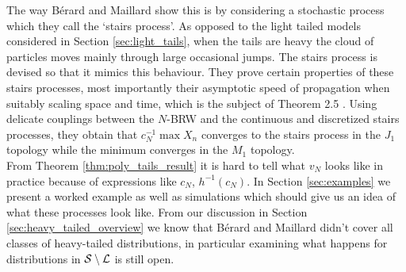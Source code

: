 The way Bérard and Maillard show this is by considering a stochastic process which they call the `stairs process'. As opposed to the light tailed models considered in Section \ref{sec:light_tails}, when the tails are heavy the cloud of particles moves mainly through large occasional jumps. The stairs process is devised so that it mimics this behaviour. They prove certain properties of these stairs processes, most importantly their asymptotic speed of propagation when suitably scaling space and time, which is the subject of Theorem 2.5 \cite{poly_tails}. Using delicate couplings between the $N$-BRW and the continuous and discretized stairs processes, they obtain that $c_N^{-1} \max X_n$ converges to the stairs process in the $J_1$ topology while the minimum converges in the $M_1$ topology. \\

From Theorem \ref{thm:poly_tails_result} it is hard to tell what $v_N$ looks like in practice because of expressions like $c_N$, $h^{-1}(c_N)$. In Section \ref{sec:examples} we present a worked example as well as simulations which should give us an idea of what these processes look like. From our discussion in Section \ref{sec:heavy_tailed_overview} we know that Bérard and Maillard didn't cover all classes of heavy-tailed distributions, in particular examining what happens for distributions in $\cal{S} \setminus \cal{L}$ is still open.





